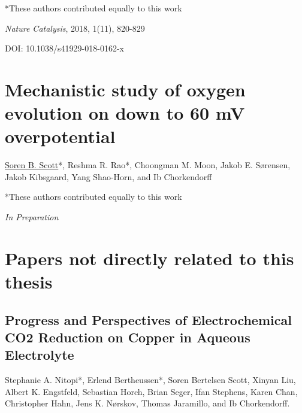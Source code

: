 \begin{appendices}
		*These authors contributed equally to this work
		
		\textit{Nature Catalysis}, 2018, 1(11), 820-829 
		
		DOI: 10.1038/s41929-018-0162-x
		
			
		
		\clearpage
		\section[In Preparation: Mechanistic study of oxygen evolution on \ch{RuO2} down to 60 mV overpotential]{Mechanistic study of oxygen evolution on  down to 60 mV overpotential}\label{Scott2019_RuO2}
		
		\underline{Soren B. Scott}*, Reshma R. Rao*, Choongman M. Moon, Jakob E. S\o rensen, Jakob Kibsgaard, Yang Shao-Horn, and Ib Chorkendorff
		
		*These authors contributed equally to this work
		
		\textit{In Preparation}
		
		\clearpage
		\renewcommand{\thesection}{}
		\titleformat{\section}{\normalfont\LARGE\bfseries}{\thesection}{1em}{}	
		
		\section{Papers not directly related to this thesis}
		\renewcommand{\thesubsection}{\Roman{subsection}}
		\setcounter{subsection}{4}
		\vspace{2cm}

		\subsection{Progress and Perspectives of Electrochemical CO2 Reduction on Copper in Aqueous Electrolyte}\label{Nitopi2019}
		
		Stephanie A. Nitopi*, Erlend Bertheussen*, Soren Bertelsen Scott, Xinyan Liu, Albert K. Engstfeld, Sebastian Horch, Brian Seger, Ifan Stephens, Karen Chan, Christopher Hahn, Jens K. Nørskov, Thomas Jaramillo, and Ib Chorkendorff.
		

\end{appendices}
